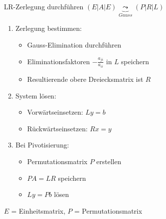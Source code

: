 \begin{KR}{LR-Zerlegung durchführen}
    $(E | A | E) \underbrace{\leadsto}_{Gauss} (P | R | L)$
    \vspace{-3mm}\\
\begin{enumerate}
    \item Zerlegung bestimmen:
    \begin{itemize}
        \item Gauss-Elimination durchführen
        \item Eliminationsfaktoren $-\frac{a_{ji}}{a_{ii}}$ in $L$ speichern
        \item Resultierende obere Dreiecksmatrix ist $R$
    \end{itemize}
    
    \item System lösen:
    \begin{itemize}
        \item Vorwärtseinsetzen: $Ly = b$
        \item Rückwärtseinsetzen: $Rx = y$
    \end{itemize}
    
    \item Bei Pivotisierung:
    \begin{itemize}
        \item Permutationsmatrix $P$ erstellen
        \item $PA = LR$ speichern
        \item $Ly = Pb$ lösen
    \end{itemize}
\end{enumerate}
\end{KR}

\begin{remark}
    $E$ = Einheitsmatrix, $P$ = Permutationsmatrix
\end{remark}


